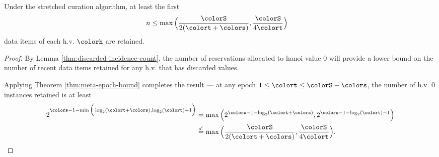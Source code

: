 \begin{lemma}
\label{thm:stretched-reservation-count}
Under the stretched curation algorithm, at least the first
\begin{align*}
n &\leq
\max\Big(
  \frac{\colorS}{2(\colort + \colors)},
  \frac{\colorS}{4\colort}
\Big)
\end{align*}
data items of each h.v. $\colorh$ are retained.
\end{lemma}
\begin{proof}

By Lemma \ref{thm:discarded-incidence-count}, the number of reservations allocated to hanoi value 0 will provide a lower bound on the number of recent data items retained for any h.v. that has discarded values.

Applying Theorem \ref{thm:meta-epoch-bound} completes the result --- at any epoch $1 \leq \colort \leq \colorS - \colors$, the number of h.v. 0 instances retained is at least
\begin{align*}
2^{\colors - 1 - \min\Big(
  \log_2(\colort + \colors),
  \log_2(\colort) + 1
\Big)}
&= \max\Big(
  2^{\colors - 1 - \log_2(\colort + \colors)},
  2^{\colors - 1 - \log_2(\colort) - 1}
\Big)\\
&\stackrel{\checkmark}{=} \max\Big(
  \frac{\colorS}{2(\colort + \colors)},
  \frac{\colorS}{4\colort}
\Big).
\end{align*}

\end{proof}
